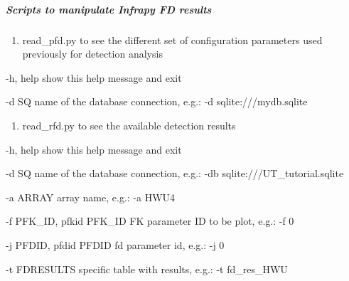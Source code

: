 \documentclass[letterpaper,10pt,english]{sphinxmanual}
\begin{document}
\subparagraph{Scripts to manipulate Infrapy FD results}
\label{\detokenize{scripts:scripts-to-manipulate-infrapy-fd-results}}\begin{enumerate}
\def\theenumi{\arabic{enumi}}
\def\labelenumi{\theenumi .}
\makeatletter\def\p@enumii{\p@enumi \theenumi .}\makeatother
\item {} 
read\_pfd.py to see the different set of configuration parameters used previously for detection analysis

\end{enumerate}

\begin{DUlineblock}{0em}
\item[] -h, \textendash{}help  show this help message and exit
\item[] -d SQ       name of the database connection, e.g.: -d sqlite:///mydb.sqlite
\end{DUlineblock}

\begin{sphinxVerbatim}[commandchars=\\\{\}]
  \PYG{p}{[}\PYG{p}{]}  
\end{sphinxVerbatim}
\begin{enumerate}
\def\theenumi{\arabic{enumi}}
\def\labelenumi{\theenumi .}
\makeatletter\def\p@enumii{\p@enumi \theenumi .}\makeatother
\setcounter{enumi}{1}
\item {} 
read\_rfd.py to see the available detection results

\end{enumerate}

\begin{DUlineblock}{0em}
\item[] -h, \textendash{}help            show this help message and exit
\item[] -d SQ                 name of the database connection, e.g.: -db sqlite:///UT\_tutorial.sqlite
\item[] -a ARRAY              array name, e.g.: -a HWU4
\item[] -f PFK\_ID, \textendash{}pfkid PFK\_ID FK parameter ID to be plot, e.g.: -f 0
\item[] -j PFDID, \textendash{}pfdid PFDID fd parameter id, e.g.: -j 0
\item[] -t FDRESULTS          specific table with results, e.g.: -t fd\_res\_HWU
\end{DUlineblock}
\end{document}
